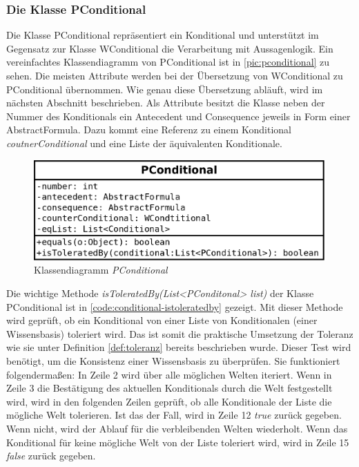 \documentclass[12pt,a4paper]{article}
\begin{document}
\subsubsection{Die Klasse PConditional}
\label{sec:pconditional}





Die Klasse PConditional repräsentiert ein Konditional und unterstützt im Gegensatz zur Klasse WConditional die Verarbeitung mit Aussagenlogik. Ein vereinfachtes Klassendiagramm von PConditional ist in \autoref{pic:pconditional} zu sehen. Die meisten Attribute werden bei der Übersetzung von WConditional zu PConditional übernommen. Wie genau diese Übersetzung abläuft, wird im nächsten Abschnitt beschrieben. Als Attribute besitzt die Klasse neben der Nummer des Konditionals ein Antecedent und Consequence jeweils in Form einer AbstractFormula. Dazu kommt eine Referenz zu einem Konditional \textit{coutnerConditional} und eine Liste der äquivalenten Konditionale.


\begin{figure}
\includegraphics[width=0.55\linewidth]{bilder/PConditional.png}
\caption{Klassendiagramm \textit{PConditional}}
\label{pic:pconditional}
\end{figure}






Die wichtige Methode \textit{isToleratedBy(List<PConditonal> list)} der Klasse PConditional ist in \autoref{code:conditional-istoleratedby} gezeigt. Mit dieser Methode wird geprüft, ob ein Konditional von einer Liste von Konditionalen (einer Wissensbasis) toleriert wird. Das ist somit die praktische Umsetzung der Toleranz wie sie unter Definition \ref{def:toleranz} bereits beschrieben wurde. Dieser Test wird benötigt, um die Konsistenz einer Wissensbasis zu überprüfen. Sie funktioniert folgendermaßen: In Zeile 2 wird über alle möglichen Welten iteriert. Wenn in Zeile 3 die Bestätigung des aktuellen Konditionals durch die Welt festgestellt wird, wird in den folgenden Zeilen geprüft, ob alle Konditionale der Liste die mögliche Welt tolerieren. Ist das der Fall, wird in Zeile 12 \textit{true} zurück gegeben. Wenn nicht, wird der Ablauf für die verbleibenden Welten wiederholt. Wenn das Konditional für keine mögliche Welt von der Liste toleriert wird, wird in Zeile 15 \textit{false} zurück gegeben.
\end{document}
